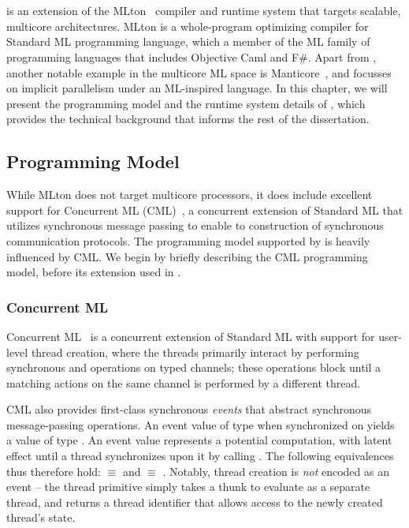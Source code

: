\chapter{\MM}
\label{chap:mm}

\MM is an extension of the MLton~\cite{MLton} compiler and runtime system that
targets scalable, multicore architectures. MLton is a whole-program optimizing
compiler for Standard ML programming language, which a member of the ML family
of programming languages that includes Objective Caml and F\#. Apart from \MM,
another notable example in the multicore ML space is
Manticore~\cite{Fluet2007}, and focusses on implicit parallelism under an
ML-inspired language. In this chapter, we will present the programming model
and the runtime system details of \MM, which provides the technical background
that informs the rest of the dissertation.

\section{Programming Model}

While MLton does not target multicore processors, it does include excellent
support for Concurrent ML (CML)~\cite{Reppy99}, a concurrent extension of
Standard ML that utilizes synchronous message passing to enable to construction
of synchronous communication protocols. The programming model supported by \MM
is heavily influenced by CML. We begin by briefly describing the CML
programming model, before its extension used in \MM.

\subsection{Concurrent ML}

Concurrent ML~\cite{Reppy99} is a concurrent extension of Standard ML with
support for user-level thread creation, where the threads primarily interact by
performing synchronous  and  operations on typed channels;
these operations block until a matching actions on the same channel is
performed by a different thread.

CML also provides first-class synchronous {\em events} that abstract
synchronous message-passing operations.  An event value of type 
when synchronized on yields a value of type .  An event value represents
a potential computation, with latent effect until a thread synchronizes upon it
by calling . The following equivalences thus therefore hold:
 $\equiv$  and  $\equiv$
. Notably, thread creation is {\em not} encoded as an
event -- the thread  primitive simply takes a thunk to evaluate as a
separate thread, and returns a thread identifier that allows access to the
newly created thread's state.

